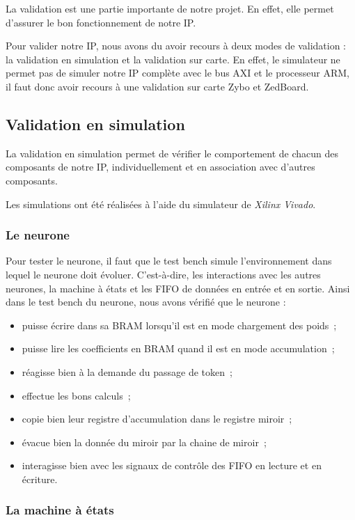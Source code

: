 La validation est une partie importante de notre projet. En effet, elle permet
d'assurer le bon fonctionnement de notre IP.

Pour valider notre IP, nous avons du avoir recours à deux modes de validation :
la validation en simulation et la validation sur carte.
En effet, le simulateur ne permet pas de simuler notre IP complète avec le bus
AXI et le processeur ARM, il faut donc avoir recours à une validation sur carte
Zybo et ZedBoard.

\subsection{Validation en simulation}

La validation en simulation permet de vérifier le comportement de chacun des
composants de notre IP, individuellement et en association avec d'autres
composants.

Les simulations ont été réalisées à l'aide du simulateur de {\em Xilinx Vivado}.

\subsubsection{Le neurone}
Pour tester le neurone, il faut que le test bench simule l'environnement dans lequel
le neurone doit évoluer. C'est-à-dire, les interactions avec les autres neurones,
la machine à états et les FIFO de données en entrée et en sortie.
Ainsi dans le test bench du neurone, nous avons vérifié que le neurone :
\begin{itemize}
	\item puisse écrire dans sa BRAM lorsqu'il est en mode chargement des poids~;
	\item puisse lire les coefficients en BRAM quand il est en mode accumulation~;
	\item réagisse bien à la demande du passage de token~;
	\item effectue les bons calculs~;
	\item copie bien leur registre d'accumulation dans le registre miroir~;
	\item évacue bien la donnée du miroir par la chaine de miroir~;
	\item interagisse bien avec les signaux de contrôle des FIFO en lecture et en écriture.
\end{itemize}

\subsubsection{La machine à états}

